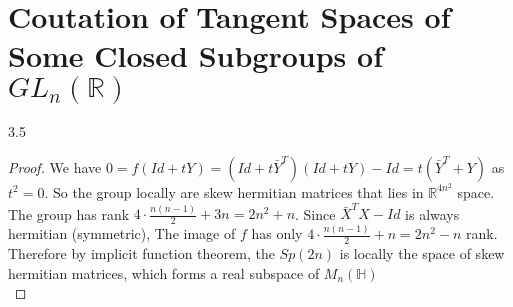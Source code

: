 \documentclass[10pt]{article}
\theoremstyle{plain}
\theoremstyle{definition}
\newenvironment{problem_hw}[1]{{\noindent\bfseries Problem #1.}}{}
\newcommand{\IH}{\mathbb{H}}
\newcommand{\IR}{\mathbb{R}}
\newcommand{\<}{\langle}
\renewcommand{\>}{\rangle}
\begin{document}
\section*{Coutation of Tangent Spaces of Some Closed Subgroups of $GL_n(\IR)$}


\begin{problem_hw}{3.5}
\end{problem_hw}

\begin{proof}

We have $0 = f(Id+tY) = (Id + t\bar{Y}^T)(Id+tY)-Id = t(\bar{Y}^T+Y)$ as $t^2 = 0$. So the group locally are skew hermitian matrices that lies in $\IR^{4n^2}$ space. The group has rank $4\cdot\frac{n(n-1)}{2}+3n = 2n^2+n$. Since $\bar{X}^T X - Id$ is always hermitian (symmetric), The image of $f$ has only $4\cdot\frac{n(n-1)}{2}+n = 2n^2-n$ rank. Therefore by implicit function theorem, the $Sp(2n)$ is locally the space of skew hermitian matrices, which forms a real subspace of $M_n(\IH)$\\

\end{proof}

 
\end{document}
